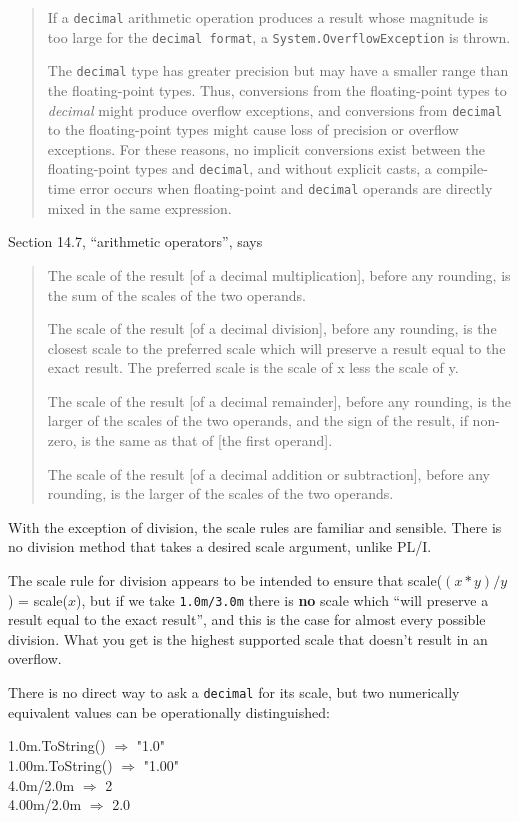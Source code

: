 \documentclass{article}
\begin{document}
\begin{quote}
If a {\tt decimal} arithmetic operation produces a result whose magnitude
is too large for the {\tt decimal format}, a
{\tt System.OverflowException} is thrown.

The {\tt decimal} type has greater precision but may have a smaller
range than the floating-point types.  Thus, conversions from the
floating-point types to {\it decimal} might produce overflow
exceptions, and conversions from {\tt decimal} to the floating-point
types might cause loss of precision or overflow exceptions.  For
these reasons, no implicit conversions exist between the floating-point
types and {\tt decimal}, and without explicit casts, a compile-time
error occurs when floating-point and {\tt decimal} operands are
directly mixed in the same expression.
\end{quote}

Section 14.7, ``arithmetic operators'', says
\begin{quote}
The scale of the result [of a decimal multiplication],
before any rounding, is the sum of the scales of the two operands.

The scale of the result [of a decimal division],
before any rounding, is the closest scale to the preferred scale which
will preserve a result equal to the exact result.  The preferred scale
is the scale of x less the scale of y.

The scale of the result [of a decimal remainder],
before any rounding, is the larger of the scales of the two operands,
and the sign of the result, if non-zero, is the same as that of [the
first operand].

The scale of the result [of a decimal addition or subtraction],
before any rounding, is the larger of the scales of the two operands.
\end{quote}

With the exception of division, the scale rules are familiar and
sensible. There is no division method that
takes a desired scale argument, unlike PL/I.

The scale rule for division appears to be intended to
ensure that scale($(x*y)/y$) = scale($x$), but if we take
{\tt 1.0m/3.0m} there is {\bf no} scale which ``will preserve a
result equal to the exact result'', and this is the case for almost
every possible division.  What you get is the highest supported scale
that doesn't result in an overflow.

There is no direct way to ask a {\tt decimal} for its scale,
but two numerically equivalent values can be operationally
distinguished:
\begin{tabbing}
1.0m.ToString() $\Longrightarrow$ "1.0"\\
1.00m.ToString() $\Longrightarrow$ "1.00"\\
4.0m/2.0m $\Longrightarrow$ 2\\
4.00m/2.0m $\Longrightarrow$ 2.0
\end{tabbing}
\end{document}
